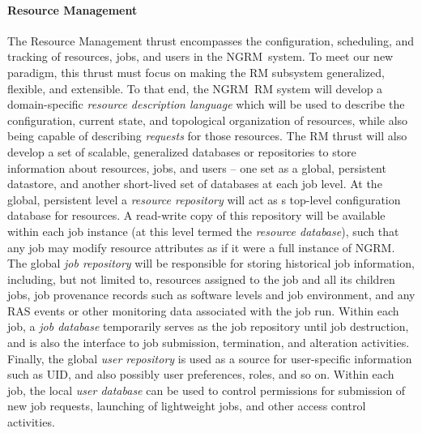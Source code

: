 \documentclass[10pt]{article}
\newcommand{\ngrm}{NGRM}
\begin{document}
\paragraph{Resource Management}

The Resource Management thrust encompasses the configuration,
scheduling, and tracking of resources, jobs, and users in the \ngrm\
system. To meet our new paradigm, this thrust must focus on making
the RM subsystem generalized, flexible, and extensible. To that
end, the \ngrm\ RM system will develop a domain-specific {\em
resource description language} which will be used to describe
the configuration, current state, and topological organization of
resources, while also being capable of describing {\em requests} for
those resources.  The RM thrust will also develop a set of scalable,
generalized databases or repositories to store information about
resources, jobs, and users -- one set as a global, persistent
datastore, and another short-lived set of databases at each job
level. At the global, persistent level a {\em resource repository}
will act as s top-level configuration database for resources. A
read-write copy of this repository will be available within each
job instance (at this level termed the {\em resource database}),
such that any job may modify resource attributes as if it were a
full instance of \ngrm. The global {\em job repository} will be
responsible for storing historical job information, including,
but not limited to, resources assigned to the job and all its
children jobs, job provenance records such as software levels
and job environment, and any RAS events or other monitoring data
associated with the job run. Within each job, a {\em job database}
temporarily serves as the job repository until job destruction,
and is also the interface to job submission, termination, and
alteration activities.  Finally, the global {\em user repository}
is used as a source for user-specific information such as UID, and
also possibly user preferences, roles, and so on. Within each job,
the local {\em user database} can be used to control permissions
for submission of new job requests, launching of lightweight jobs,
and other access control activities.
\end{document}
